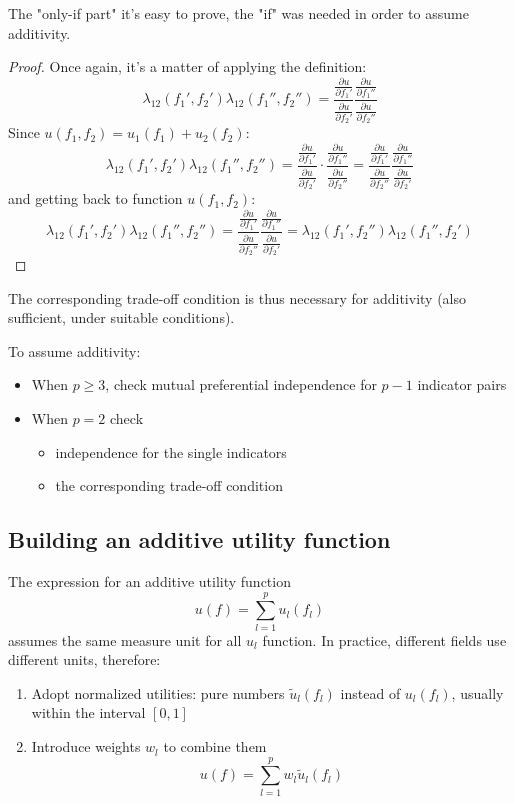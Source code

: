 The "only-if part" it's easy to prove, the "if" was needed in order to assume additivity.

\begin{proof}
	Once again, it's a matter of applying the definition:
	$$ \lambda_{12} (f_1', f_2') \lambda_{12} (f_1'', f_2'') = \frac{\frac{\partial u}{\partial f_1'}}{\frac{\partial u}{\partial f_2'}} \frac{\frac{\partial u}{\partial f_1''}}{\frac{\partial u}{\partial f_2''}} $$
	Since $u(f_1, f_2) = u_1(f_1) + u_2(f_2)$:
	$$ \lambda_{12} (f_1', f_2') \lambda_{12} (f_1'', f_2'') = \frac{\frac{\partial u}{\partial f_1'}}{\frac{\partial u}{\partial f_2'}} \cdot \frac{\frac{\partial u}{\partial f_1''}}{\frac{\partial u}{\partial f_2''}} 
	= 
	\frac{\frac{\partial u}{\partial f_1'}}{\frac{\partial u}{\partial f_2''}} \frac{\frac{\partial u}{\partial f_1''}}{\frac{\partial u}{\partial f_2'}}
	$$
	and getting back to function $u(f_1, f_2)$:
	$$ 
	\lambda_{12} (f_1', f_2') \lambda_{12} (f_1'', f_2'') = \frac{\frac{\partial u}{\partial f_1'}}{\frac{\partial u}{\partial f_2''}} \frac{\frac{\partial u}{\partial f_1''}}{\frac{\partial u}{\partial f_2'}}
	= \lambda_{12} (f_1', f_2'') \lambda_{12} (f_1'', f_2')
	$$
\end{proof}

The corresponding trade-off condition is thus necessary for additivity (also sufficient, under suitable conditions).

To assume additivity: 
\begin{itemize}
	\item When $p \geq 3$, check mutual preferential independence for $p-1$ indicator pairs
	
	\item When $p=2$ check
	\begin{itemize}
		\item independence for the single indicators
		
		\item the corresponding trade-off condition
	\end{itemize}
\end{itemize}

\subsection{Building an additive utility function}
\label{subsec:buildingadditive}

The expression for an additive utility function
$$ u(f) = \sum_{l = 1}^p u_l (f_l) $$
assumes the same measure unit for all $u_l$ function. In practice, different fields use different units, therefore:
\begin{enumerate}
	\item Adopt normalized utilities: pure numbers $\tilde u_l (f_l)$ instead of $u_l (f_l)$, usually within the interval $[0,1]$
	
	\item Introduce weights $w_l$ to combine them
	$$ u(f) = \sum_{l = 1}^p w_l \tilde u_l (f_l) $$
\end{enumerate}

